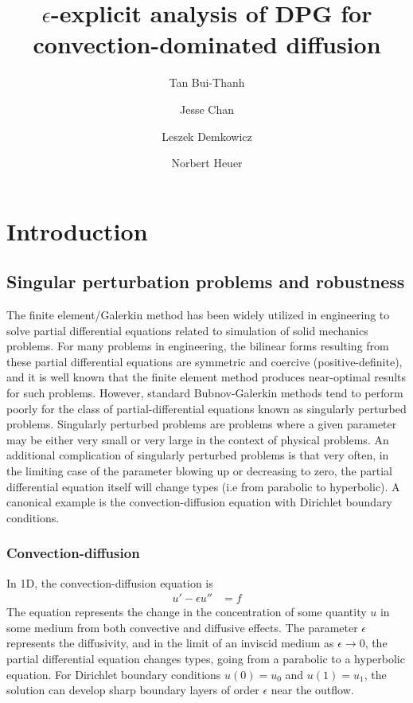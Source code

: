 \documentclass[11pt,onecolumn]{scrartcl}
\author{Tan Bui-Thanh \and Jesse Chan \and Leszek Demkowicz \and Norbert Heuer}
\title{$\epsilon$-explicit analysis of DPG for convection-dominated diffusion}
\date{}
\begin{document}
\tableofcontents
\maketitle

\section{Introduction}

\subsection{Singular perturbation problems and robustness}

The finite element/Galerkin method has been widely utilized in engineering to solve partial differential equations related to simulation of solid mechanics problems. For many problems in engineering, the bilinear forms resulting from these partial differential equations are symmetric and coercive (positive-definite), and it is well known that the finite element method produces near-optimal results for such problems. However, standard Bubnov-Galerkin methods tend to perform poorly for the class of partial-differential equations known as singularly perturbed problems. Singularly perturbed problems are problems where a given parameter may be either very small or very large in the context of physical problems.  An additional complication of singularly perturbed problems is that very often, in the limiting case of the parameter blowing up or decreasing to zero, the partial differential equation itself will change types (i.e from parabolic to hyperbolic). A canonical example is the convection-diffusion equation with Dirichlet boundary conditions. 

\subsubsection{Convection-diffusion}

In 1D, the convection-diffusion equation is
\begin{align*}
u'-\epsilon u'' &= f
\end{align*}
The equation represents the change in the concentration of some quantity $u$ in some medium from both convective and diffusive effects. The parameter $\epsilon$ represents the diffusivity, and in the limit of an inviscid medium as $\epsilon\rightarrow 0$, the partial differential equation changes types, going from a parabolic to a hyperbolic equation. For Dirichlet boundary conditions $u(0)=u_0$ and $u(1)= u_1$, the solution can develop sharp boundary layers of order $\epsilon$ near the outflow. 
\end{document}

